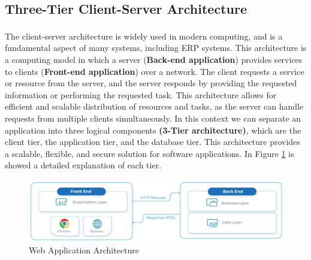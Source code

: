 \subsection{Three-Tier Client-Server Architecture}
The client-server architecture\textsuperscript{\cite{web_application}} is widely used in modern
computing, and is a fundamental aspect of many systems, including ERP systems. This architecture is
a computing model in which a server (\textbf{Back-end application}) provides services to clients
(\textbf{Front-end application}) over a network. The client requests a service or resource from the
server, and the server responds by providing the requested information or performing the requested
task. This architecture allows for efficient and scalable distribution of resources and tasks, as
the server can handle requests from multiple clients simultaneously.
\newline\newline
In this context we can separate an application into three logical components \textbf{(3-Tier
    architecture)}, which are the client tier, the application tier, and the database tier. This
architecture provides a scalable, flexible, and secure solution for software applications. In Figure
\ref{fig:2_ERP_arch} is showed a detailed explanation of each tier.

\begin{figure}\centering
    \includegraphics[scale=0.33]{Pictures/2_ERP_arch.jpg}
    \caption{Web Application Architecture}
    \label{fig:2_ERP_arch}
\end{figure}

